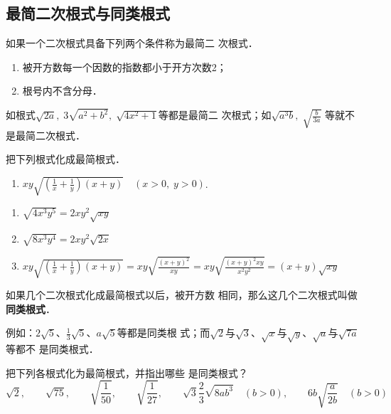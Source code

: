 \subsection{最简二次根式与同类根式}
如果一个二次根式具备下列两个条件称为最简二
次根式．
\begin{enumerate}
    \item 被开方数每一个因数的指数都小于开方次数2；
    \item 根号内不含分母．
\end{enumerate}

如根式$\sqrt{2a},\; 3\sqrt{a^2+b^2},\; \sqrt{4x^2+1}$等都是最简二
次根式；如$\sqrt{a^3b},\; \sqrt{\frac{b}{3a}}$
等就不是最简二次根式．

\begin{example}
    把下列根式化成最简根式．
\begin{enumerate}
    \item  $x y \sqrt{\left(\frac{1}{x}+\frac{1}{y}\right)(x+y)} \quad(x>0, \; y>0)$.
\end{enumerate}
\end{example}

\begin{solution}
\begin{enumerate}
    \item $\sqrt{4 x^{3} y^{5}}=2 x y^{2} \sqrt{x y}$
    \item $\sqrt{8 x^{3} y^{4}}=2 x y^{2} \sqrt{2 x}$
    \item $
    x y \sqrt{\left(\frac{1}{x}+\frac{1}{y}\right)(x+y)}
=x y \sqrt{\frac{(x+y)^{2}}{x y}}
={x} y \sqrt{\frac{(x+y)^{2} x y}{x^{2} y^{2}}}
=(x+y) \sqrt{x y}$
\end{enumerate}
    
\end{solution}

如果几个二次根式化成最简根式以后，被开方数
相同，那么这几个二次根式叫做\textbf{同类根式}．

例如：$2\sqrt{5}$、$\frac{1}{3}\sqrt{5}$、$a\sqrt{5}$等都是同类根
式；而$\sqrt{2}$与$\sqrt{3}$、$\sqrt{x}$与$\sqrt{y}$、$\sqrt{a}$与$\sqrt{7a}$等都不
是同类根式．

\begin{example}
    把下列各根式化为最简根式，并指出哪些
是同类根式？
\[\sqrt{2},\qquad \sqrt{75},\qquad \sqrt{\frac{1}{50}},\qquad \sqrt{\frac{1}{27}},\qquad \sqrt{3}\frac{2}{3}\sqrt{8ab^3}\quad (b>0),\qquad 6b\sqrt{\frac{a}{2b}}\quad (b>0)\]
\end{example}


